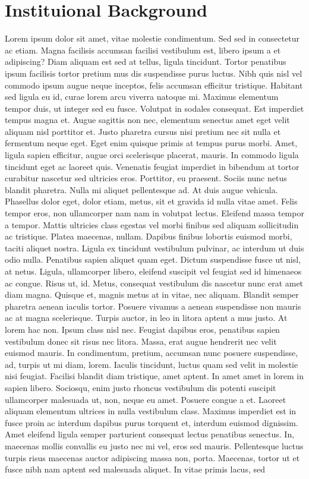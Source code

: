 \documentclass[
  12pt,
]{article}
\begin{document}
\hypertarget{inst}{%
\section{Instituional Background}\label{inst}}

Lorem ipsum dolor sit amet, vitae molestie condimentum. Sed sed in consectetur ac etiam. Magna facilisis accumsan facilisi vestibulum est, libero ipsum a et adipiscing? Diam aliquam est sed at tellus, ligula tincidunt. Tortor penatibus ipsum facilisis tortor pretium mus dis suspendisse purus luctus. Nibh quis nisl vel commodo ipsum augue neque inceptos, felis accumsan efficitur tristique. Habitant sed ligula eu id, curae lorem arcu viverra natoque mi. Maximus elementum tempor duis, ut integer sed eu fusce. Volutpat in sodales consequat. Est imperdiet tempus magna et. Augue sagittis non nec, elementum senectus amet eget velit aliquam nisl porttitor et. Justo pharetra cursus nisi pretium nec sit nulla et fermentum neque eget. Eget enim quisque primis at tempus purus morbi. Amet, ligula sapien efficitur, augue orci scelerisque placerat, mauris. In commodo ligula tincidunt eget ac laoreet quis. Venenatis feugiat imperdiet in bibendum at tortor curabitur nascetur sed ultricies eros. Porttitor, eu praesent. Sociis nunc netus blandit pharetra. Nulla mi aliquet pellentesque ad. At duis augue vehicula. Phasellus dolor eget, dolor etiam, metus, sit et gravida id nulla vitae amet. Felis tempor eros, non ullamcorper nam nam in volutpat lectus. Eleifend massa tempor a tempor. Mattis ultricies class egestas vel morbi finibus sed aliquam sollicitudin ac tristique. Platea maecenas, nullam. Dapibus finibus lobortis euismod morbi, taciti aliquet nostra. Ligula ex tincidunt vestibulum pulvinar, ac interdum ut duis odio nulla. Penatibus sapien aliquet quam eget. Dictum suspendisse fusce ut nisl, at netus. Ligula, ullamcorper libero, eleifend suscipit vel feugiat sed id himenaeos ac congue. Risus ut, id. Metus, consequat vestibulum dis nascetur nunc erat amet diam magna. Quisque et, magnis metus at in vitae, nec aliquam. Blandit semper pharetra aenean iaculis tortor. Posuere vivamus a aenean suspendisse non mauris ac at magna scelerisque. Turpis auctor, in leo in litora aptent a mus justo. At lorem hac non. Ipsum class nisl nec. Feugiat dapibus eros, penatibus sapien vestibulum donec sit risus nec litora. Massa, erat augue hendrerit nec velit euismod mauris. In condimentum, pretium, accumsan nunc posuere suspendisse, ad, turpis ut mi diam, lorem. Iaculis tincidunt, luctus quam sed velit in molestie nisi feugiat. Facilisi blandit diam tristique, amet aptent. In amet amet in lorem in sapien libero. Sociosqu, enim justo rhoncus vestibulum dis potenti suscipit ullamcorper malesuada ut, non, neque eu amet. Posuere congue a et. Laoreet aliquam elementum ultrices in nulla vestibulum class. Maximus imperdiet est in fusce proin ac interdum dapibus purus torquent et, interdum euismod dignissim. Amet eleifend ligula semper parturient consequat lectus penatibus senectus. In, maecenas mollis convallis eu justo nec mi vel, eros sed mauris. Pellentesque luctus turpis risus maecenas auctor adipiscing massa non, porta. Maecenas, tortor ut et fusce nibh nam aptent sed malesuada aliquet. In vitae primis lacus, sed 
\end{document}
